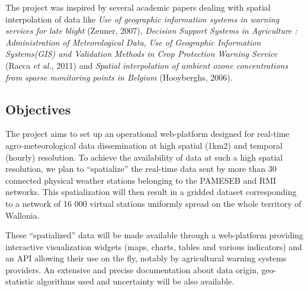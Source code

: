 \documentclass[12pt,twoside]{reedthesis}
\theoremstyle{definition}
\theoremstyle{definition}
\theoremstyle{definition}
\theoremstyle{remark}
\begin{document}
The project was inspired by several academic papers dealing with spatial
interpolation of data like \emph{Use of geographic information systems
in warning services for late blight} (Zeuner, 2007), \emph{Decision
Support Systems in Agriculture : Administration of Meteorological Data,
Use of Geographic Information Systems(GIS) and Validation Methods in
Crop Protection Warning Service} (Racca \emph{et al.}, 2011) and
\emph{Spatial interpolation of ambient ozone concentrations from sparse
monitoring points in Belgium} (Hooyberghs, 2006).

\subsection{Objectives}\label{objectives}

The project aims to set up an operational web-platform designed for
real-time agro-meteorological data dissemination at high spatial (1km2)
and temporal (hourly) resolution. To achieve the availability of data at
such a high spatial resolution, we plan to ``spatialize'' the real-time
data sent by more than 30 connected physical weather stations belonging
to the PAMESEB and RMI networks. This spatialization will then result in
a gridded dataset corresponding to a network of 16 000 virtual stations
uniformly spread on the whole territory of Wallonia.

These ``spatialized'' data will be made available through a web-platform
providing interactive visualization widgets (maps, charts, tables and
various indicators) and an API allowing their use on the fly, notably by
agricultural warning systems providers. An extensive and precise
documentation about data origin, geo-statistic algorithms used and
uncertainty will be also available.

~
\end{document}
